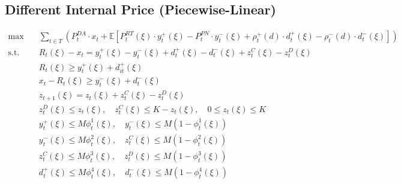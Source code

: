 \documentclass[10pt]{article}
\begin{document}
\subsection{Different Internal Price (Piecewise-Linear)}
\begin{subequations}
    \begin{align}
        \text{max} \quad &\sum_{t\in T}\left(P_t^{DA} \cdot x_{t} + \mathbb{E}\left[P_t^{RT}(\xi) \cdot y^+_{t}(\xi) - P_t^{PN} \cdot y^-_{t}(\xi) + \rho^+_t(d) \cdot d^+_{t}(\xi) - \rho^-_t(d) \cdot d^-_{t}(\xi)\right]\right)&\\   
        \text{s.t.} \quad &R_{t}(\xi) - x_{t} = y_{t}^{+}(\xi) - y_{t}^{-}(\xi) + d^+_{t}(\xi) - d^-_{t}(\xi) + z^C_{t}(\xi) - z^D_{t}(\xi) &\\
        & R_{t}(\xi) \geq y^+_t(\xi) + d^+_{it}(\xi)&\\
        & x_{t} - R_{t}(\xi) \geq y^-_{t}(\xi) + d^-_{t}(\xi)&\\
        &z_{t+1}(\xi) = z_{t}(\xi) + z^C_{t}(\xi) - z^D_{t}(\xi)&\\
        &z^D_{t}(\xi) \le z_{t}(\xi), \quad z^C_{t}(\xi) \le K - z_{t}(\xi), \quad 0 \leq z_{t}(\xi) \leq K &\\
        &y^+_{t}(\xi) \leq M \phi^1_{t}(\xi), \quad y^-_{t}(\xi) \leq M (1 - \phi^1_{t}(\xi)) &\\
        &y^-_{t}(\xi) \leq M \phi^2_{t}(\xi), \quad z^C_{t}(\xi) \leq M (1 - \phi^2_{t}(\xi)) &\\
        &z^C_{t}(\xi) \leq M \phi^3_{t}(\xi), \quad z^D_{t}(\xi) \leq M (1 - \phi^3_{t}(\xi)) &\\
        &d^+_{t}(\xi) \leq M \phi^4_{t}(\xi), \quad d^-_{t}(\xi) \leq M (1 - \phi^4_{t}(\xi))&
    \end{align}
\end{subequations}
\end{document}
